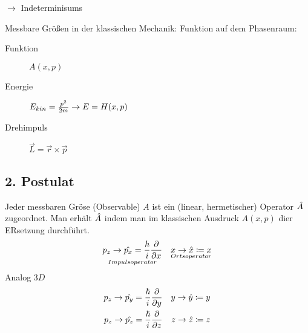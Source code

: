 \begin{bem}
    $\longrightarrow$ Indeterminisums
\end{bem}
    
Messbare Größen in der klassischen Mechanik: Funktion auf dem Phasenraum:
\begin{description}
    \item[Funktion] $A(x,p)$
    \item[Energie] $E_{kin} = \frac{p^2}{2m} \rightarrow E=H(x,p)$
    \item[Drehimpuls] $\vec{L} = \vec{r} \times \vec{p}$
\end{description}

\subsection{2. Postulat} %
\label{ssub:2._Postulat}
Jeder messbaren Gröse (Observable) $A$ ist ein (linear, hermetischer) Operator
$\hat{A}$ zugeordnet. Man erhält $\hat{A}$ indem man im klassischen Ausdruck
$A(x,p)$ dier ERsetzung durchführt.
\begin{align*}
    \underset{Impulsoperator}{p_z \rightarrow \hat{p_x} = \frac{\hbar}{i}\frac{\partial}{\partial
    x}} && \underset{Ortsoperator}{x \rightarrow \hat{x} \coloneqq x} \\
\end{align*}
Analog $3D$
\begin{align*}
    p_z \rightarrow \hat{p_y} = \frac{\hbar}{i}\frac{\partial}{\partial y} &&  y \rightarrow \hat{y} \coloneqq y \\
    p_z \rightarrow \hat{p_z} = \frac{\hbar}{i}\frac{\partial}{\partial z} &&  z \rightarrow \hat{z} \coloneqq z 
\end{align*}
